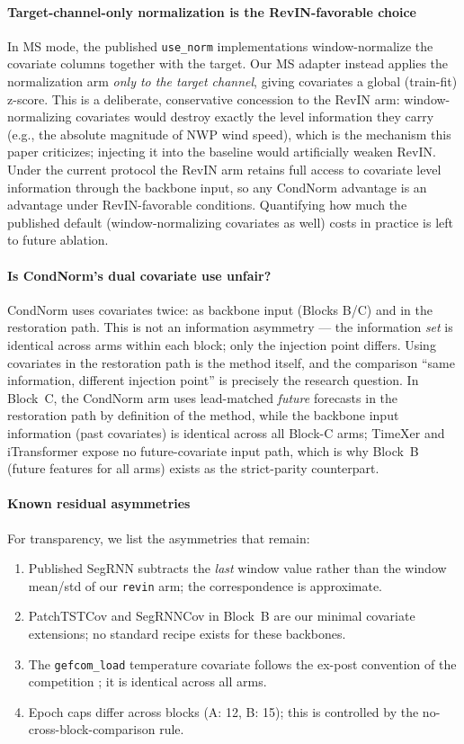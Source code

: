 \paragraph{Target-channel-only normalization is the RevIN-favorable choice}
In MS mode, the published \texttt{use\_norm} implementations window-normalize
the covariate columns together with the target. Our MS adapter instead applies
the normalization arm \emph{only to the target channel}, giving covariates a
global (train-fit) z-score. This is a deliberate, conservative concession to
the RevIN arm: window-normalizing covariates would destroy exactly the level
information they carry (e.g., the absolute magnitude of NWP wind speed), which
is the mechanism this paper criticizes; injecting it into the baseline would
artificially weaken RevIN. Under the current protocol the RevIN arm retains
full access to covariate level information through the backbone input, so any
CondNorm advantage is an advantage under RevIN-favorable conditions.
Quantifying how much the published default (window-normalizing covariates as
well) costs in practice is left to future ablation.

\paragraph{Is CondNorm's dual covariate use unfair?}
CondNorm uses covariates twice: as backbone input (Blocks B/C) and in the
restoration path. This is not an information asymmetry --- the information
\emph{set} is identical across arms within each block; only the injection
point differs. Using covariates in the restoration path is the method itself,
and the comparison ``same information, different injection point'' is
precisely the research question. In Block~C, the CondNorm arm uses lead-matched
\emph{future} forecasts in the restoration path by definition of the method,
while the backbone input information (past covariates) is identical across all
Block-C arms; TimeXer and iTransformer expose no future-covariate input path,
which is why Block~B (future features for all arms) exists as the
strict-parity counterpart.

\paragraph{Known residual asymmetries}
For transparency, we list the asymmetries that remain:
\begin{enumerate}
\item Published SegRNN subtracts the \emph{last} window value rather than the
  window mean/std of our \texttt{revin} arm; the correspondence is approximate.
\item PatchTSTCov and SegRNNCov in Block~B are our minimal covariate
  extensions; no standard recipe exists for these backbones.
\item The \texttt{gefcom\_load} temperature covariate follows the ex-post
  convention of the competition \citep{hong2016gefcom}; it is identical across
  all arms.
\item Epoch caps differ across blocks (A: 12, B: 15); this is controlled by
  the no-cross-block-comparison rule.
\end{enumerate}

